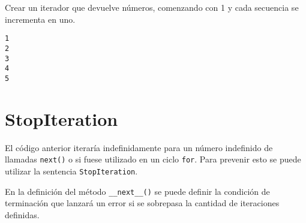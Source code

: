 \begin{code} 
Crear un iterador que devuelve números, comenzando con 1 y cada secuencia se incrementa en uno.

\begin{Shaded}
\begin{Highlighting}[]
   \NormalTok{(}\NormalTok{):}
    \OperatorTok{=} 
     

   \NormalTok{(}\NormalTok{):}
\OperatorTok{=} 
    \OperatorTok{+=} 

\OperatorTok{=}
\OperatorTok{=} 

\NormalTok{(}
\NormalTok{(}
\NormalTok{(}
\NormalTok{(}
\NormalTok{(}
\end{Highlighting}
\end{Shaded}

\begin{verbatim}
1
2
3
4
5
\end{verbatim}
\end{code}

\section{StopIteration}

El código anterior iteraría indefinidamente para un número indefinido de
llamadas \texttt{next()} o si fuese utilizado en un ciclo \texttt{for}.
Para prevenir esto se puede utilizar la sentencia
\texttt{StopIteration}.

En la definición del método \texttt{\_\_next\_\_()} se puede definir la
condición de terminación que lanzará un error si se sobrepasa la
cantidad de iteraciones definidas.\\

